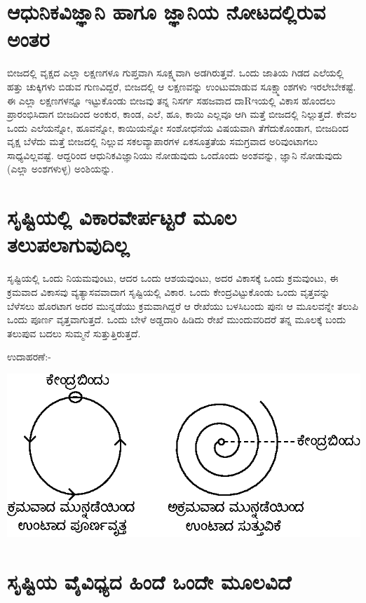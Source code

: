 \section*{ಆಧುನಿಕವಿಜ್ಞಾನಿ ಹಾಗೂ ಜ್ಞಾನಿಯ ನೋಟದಲ್ಲಿರುವ ಅಂತರ}

ಬೀಜದಲ್ಲಿ ವೃಕ್ಷದ ಎಲ್ಲಾ ಲಕ್ಷಣಗಳೂ ಗುಪ್ತವಾಗಿ ಸೂಕ್ಷ್ಮವಾಗಿ ಅಡಗಿರುತ್ತವೆ. ಒಂದು ಜಾತಿಯ ಗಿಡದ ಎಲೆಯಲ್ಲಿ ಹತ್ತು ಚುಕ್ಕಿಗಳು ಬಿಡುವ ಗುಣವಿದ್ದರೆ, ಬೀಜದಲ್ಲಿ ಆ ಲಕ್ಷಣವನ್ನು ಉಂಟುಮಾಡುವ ಸೂಕ್ಷ್ಮಾಂಶಗಳು ಇರಲೇಬೇಕಷ್ಟೆ. ಈ ಎಲ್ಲಾ ಲಕ್ಷಣಗಳನ್ನೂ ಇಟ್ಟುಕೊಂಡು ಬೀಜವು ತನ್ನ ನಿಸರ್ಗ ಸಹಜವಾದ ದಾRಇಯಲ್ಲಿ ವಿಕಾಸ ಹೊಂದಲು ಪ್ರಾರಂಭಿಸಿದಾಗ ಬೀಜದಿಂದ ಅಂಕುರ, ಕಾಂಡ, ಎಲೆ, ಹೂ, ಕಾಯಿ ಎಲ್ಲವೂ ಆಗಿ ಮತ್ತೆ ಬೀಜದಲ್ಲಿ ನಿಲ್ಲುತ್ತದೆ. ಕೇವಲ ಒಂದು ಎಲೆಯನ್ನೋ, ಹೂವನ್ನೋ, ಕಾಯಿಯನ್ನೋ ಸಂಶೋಧನೆಯ ವಿಷಯವಾಗಿ ತೆಗೆದುಕೊಂಡಾಗ, ಬೀಜದಿಂದ ವೃಕ್ಷ ಬೆಳೆದು ಮತ್ತೆ ಬೀಜದಲ್ಲಿ ನಿಲ್ಲುವ ಸಕಲವ್ಯಾಪಾರಗಳ ಏಕಸೂತ್ರತೆಯ ಸಮಗ್ರವಾದ ಅರಿವುಂಟಾಗಲು ಸಾಧ್ಯವಿಲ್ಲವಷ್ಟೆ. ಆದ್ದರಿಂದ ಆಧುನಿಕವಿಜ್ಞಾನಿಯು ನೋಡುವುದು ಒಂದೊಂದು ಅಂಶವನ್ನು, ಜ್ಞಾನಿ ನೋಡುವುದು (ಎಲ್ಲಾ ಅಂಶಗಳುಳ್ಳ) ಅಂಶಿಯನ್ನು.

\section*{ಸೃಷ್ಟಿಯಲ್ಲಿ ವಿಕಾರವೇರ್ಪಟ್ಟರೆ ಮೂಲ ತಲುಪಲಾಗುವುದಿಲ್ಲ}

ಸೃಷ್ಟಿಯಲ್ಲಿ ಒಂದು ನಿಯಮವುಂಟು, ಆದರ ಒಂದು ಆಶಯವುಂಟು, ಅದರ ವಿಕಾಸಕ್ಕೆ ಒಂದು ಕ್ರಮವುಂಟು, ಈ ಕ್ರಮವಾದ ವಿಕಾಸವು ವ್ಯತ್ಯಾಸವವಾದಾಗ ಸೃಷ್ಟಿಯಲ್ಲಿ ವಿಕಾರ. ಒಂದು ಕೇಂದ್ರವಿಟ್ಟುಕೊಂಡು ಒಂದು ವೃತ್ತವನ್ನು ಬೆಳೆಸಲು ಹೊರಟಾಗ ಅದರ ಮುನ್ನಡೆಯು ಕ್ರಮವಾಗಿದ್ದರೆ ಆ ರೇಖೆಯು ಬಳಸಿಬಂದು ಪುನಃ ಆ ಮೂಲವನ್ನೇ ತಲುಪಿ ಒಂದು ಪೂರ್ಣ ವೃತ್ತವಾಗುತ್ತದೆ. ಒಂದು ಬೇಳೆ ಅಡ್ಡದಾರಿ ಹಿಡಿದು ರೇಖೆ ಮುಂದುವರಿದರೆ ತನ್ನ ಮೂಲಕ್ಕೆ ಬಂದು ತಲುಪುವ ಬದಲು ಸುಮ್ಮನೆ ಸುತ್ತುತ್ತಿರುತ್ತದೆ.

ಉದಾಹರಣೆ:-
\begin{center}
\includegraphics{chap5-fig1.eps}
\end{center}

\section*{ಸೃಷ್ಟಿಯ ವೈವಿಧ್ಯದ ಹಿಂದೆ ಒಂದೇ ಮೂಲವಿದೆ}

